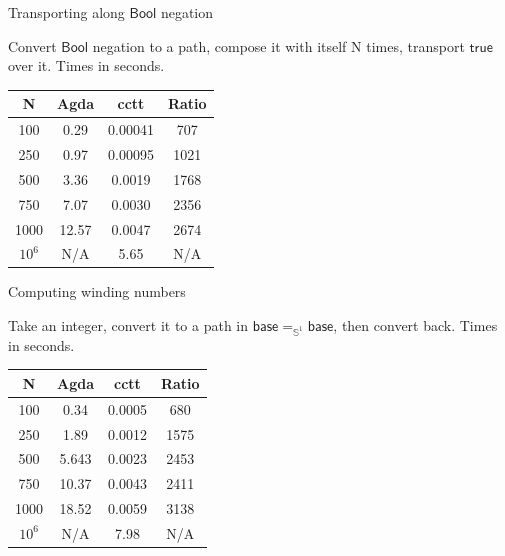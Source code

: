 \documentclass[dvipsnames]{beamer}
\newcommand{\ms}[1]{\mathsf{#1}}
\newcommand{\mbb}[1]{\mathbb{#1}}
\newcommand{\Bool}{\ms{Bool}}
\newcommand{\true}{\ms{true}}
\begin{document}
\begin{frame}{Transporting along $\ms{Bool}$ negation}

Convert $\Bool$ negation to a path, compose it with itself N times, transport
$\true$ over it. Times in seconds.
\vspace{1em}

\begin{center}
\begin{tabular}{|c||c|c|c|}
\hline
  \textbf{N} & \textbf{Agda} & \textbf{cctt} & \textbf{Ratio} \\
\hline
\hline
  100 & 0.29 & 0.00041 & 707 \\
\hline
  250 & 0.97 & 0.00095 & 1021 \\
\hline
  500 & 3.36 & 0.0019 & 1768 \\
\hline
  750 & 7.07 & 0.0030 & 2356 \\
\hline
  1000 & 12.57 & 0.0047 & 2674 \\
\hline
  $10^6$ & N/A & 5.65 & N/A \\
\hline
\end{tabular}
\end{center}


\end{frame}

\begin{frame}{Computing winding numbers}

Take an integer, convert it to a path in $\ms{base} =_{\mbb{S}^1} \ms{base}$, then convert back.
Times in seconds.
\vspace{1em}

\begin{center}
\begin{tabular}{|c||c|c|c|}
\hline
  \textbf{N} & \textbf{Agda} & \textbf{cctt} & \textbf{Ratio} \\
\hline
\hline
  100 & 0.34 & 0.0005 & 680 \\
\hline
  250 & 1.89 & 0.0012 & 1575 \\
\hline
  500 & 5.643 & 0.0023 & 2453 \\
\hline
  750 & 10.37 & 0.0043 & 2411 \\
\hline
  1000 & 18.52 & 0.0059 & 3138 \\
\hline
  $10^6$ & N/A & 7.98 & N/A \\
\hline
\end{tabular}
\end{center}

\end{frame}
\end{document}
